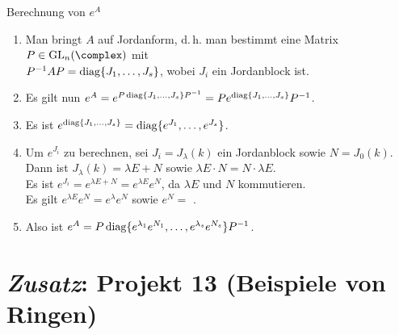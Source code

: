 \begin{Prozedur}{Berechnung von $e^A$}
    \begin{enumerate}
        \item
        Man bringt $A$ auf Jordanform, d.\,h. man bestimmt eine Matrix
        $P \in \GL_n(\complex)$ mit \\
        $P^{-1} A P = \operatorname{diag}\{J_1, \dotsc, J_s\}$,
        wobei $J_i$ ein Jordanblock ist.

        \item
        Es gilt nun $e^A = e^{P \operatorname{diag}\{J_1, \dotsc, J_s\} P^{-1}} =
        P e^{\operatorname{diag}\{J_1, \dotsc, J_s\}} P^{-1}$.

        \item
        Es ist $e^{\operatorname{diag}\{J_1, \dotsc, J_s\}} =
        \operatorname{diag}\{e^{J_1}, \dotsc, e^{J_s}\}$.

        \item
        Um $e^{J_i}$ zu berechnen, sei $J_i = J_\lambda(k)$ ein Jordanblock
        sowie $N = J_0(k)$. \\
        Dann ist $J_\lambda(k) = \lambda E + N$ sowie
        $\lambda E \cdot N = N \cdot \lambda E$. \\
        Es ist $e^{J_i} = e^{\lambda E + N} = e^{\lambda E} e^N$,
        da $\lambda E$ und $N$ kommutieren. \\
        Es gilt $e^{\lambda E} e^N = e^\lambda e^N$ sowie
        $e^N =$ .

        \item
        Also ist $e^A = P \operatorname{diag}\{e^{\lambda_1} e^{N_1}, \dotsc,
        e^{\lambda_s} e^{N_s}\} P^{-1}$.
    \end{enumerate}
\end{Prozedur}

\section{%
    \emph{Zusatz}: Projekt 13 (Beispiele von Ringen)%
}

